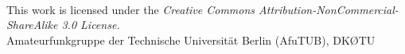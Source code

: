 

\begin{frame}
    \titlepage
    \vfill
    \begin{center}
        \ccbyncsaeu\\
        {\tiny This work is licensed under the \em{Creative Commons Attribution-NonCommercial-ShareAlike 3.0 License}.}\\[0.5ex]
         \tiny Amateurfunkgruppe der Technische Universität Berlin (AfuTUB), DKØTU
    \end{center}
\end{frame}
